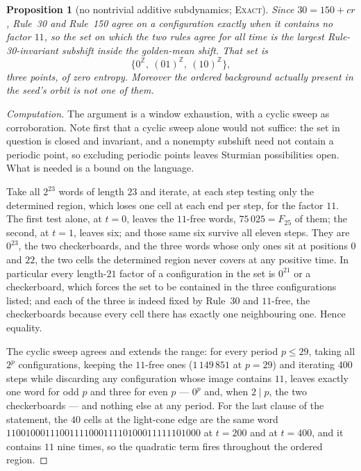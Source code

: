 \documentclass[11pt]{article}
\newtheorem{proposition}[theorem]{Proposition}
\theoremstyle{definition}
\theoremstyle{remark}
\newcommand{\Z}{\mathbb{Z}}
\newcommand{\EXACT}{\textsc{Exact}}
\begin{document}
\begin{proposition}[no nontrivial additive subdynamics; \EXACT]\label{du:nosubdyn}
Since $30=150+cr$, Rule~30 and Rule~150 agree on a configuration exactly when it contains no factor
$11$, so the set on which the two rules agree for all time is the largest Rule-30-invariant subshift
inside the golden-mean shift. That set is
\[
\{0^{\Z},\ (01)^{\Z},\ (10)^{\Z}\},
\]
three points, of zero entropy. Moreover the ordered background actually present in the seed's orbit is
not one of them.
\end{proposition}
\begin{proof}[Computation]
The argument is a window exhaustion, with a cyclic sweep as corroboration. Note first that a cyclic
sweep alone would not suffice: the set in question is closed and invariant, and a nonempty subshift need
not contain a periodic point, so excluding periodic points leaves Sturmian possibilities open. What is
needed is a bound on the language.

Take all $2^{23}$ words of length $23$ and iterate, at each step testing only the determined region,
which loses one cell at each end per step, for the factor $11$. The first test alone, at $t=0$, leaves
the $11$-free words, $75\,025=F_{25}$ of them; the second, at $t=1$, leaves six; and those same six
survive all eleven steps. They are $0^{23}$, the two checkerboards, and the three words whose only ones
sit at positions $0$ and $22$, the two cells the determined region never covers at any positive time.
In particular every length-$21$ factor of a configuration in the set is $0^{21}$ or a checkerboard,
which forces the set to be contained in the three configurations listed; and each of the three is
indeed fixed by Rule~30 and $11$-free, the checkerboards because every cell there has exactly one
neighbouring one. Hence equality.

The cyclic sweep agrees and extends the range: for every period $p\le29$, taking all $2^{p}$
configurations, keeping the $11$-free ones ($1\,149\,851$ at $p=29$) and iterating $400$ steps while
discarding any configuration whose image contains $11$, leaves exactly one word for odd $p$ and three
for even $p$ --- $0^{p}$ and, when $2\mid p$, the two checkerboards --- and nothing else at any period.
For the last clause of the statement, the $40$ cells at the light-cone edge are the same word
$1100100011100111100011110100011111101000$ at $t=200$ and at $t=400$, and it contains $11$ nine times,
so the quadratic term fires throughout the ordered region.
\end{proof}
\end{document}

